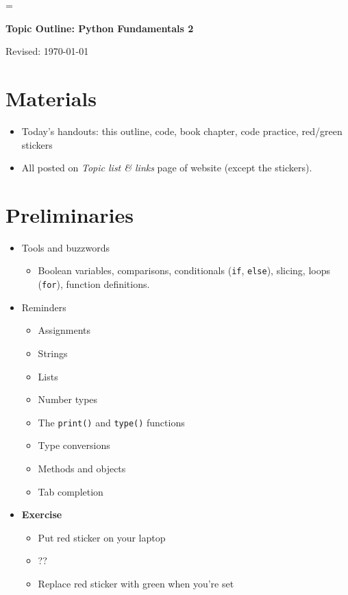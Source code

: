 \documentclass[11pt]{article}
\begin{document}
\parskip=\bigskipamount
\parindent=0.0in
\thispagestyle{empty}


\bigskip\bigskip
\centerline{\Large \bf Topic Outline:  Python Fundamentals 2}
\centerline{Revised: \today}


\section*{Materials}

\begin{itemize}
\item  Today's handouts:  this outline, code, book chapter, code practice, red/green stickers
\item  All posted on {\it Topic list \& links\/} page of website (except the stickers).
\end{itemize}


\section*{Preliminaries}

\begin{itemize}

\item Tools and buzzwords
\begin{itemize}
\item Boolean variables, comparisons, conditionals ({\tt if}, {\tt else}), slicing, 
loops ({\tt for}), function definitions.
\end{itemize}

\item Reminders
\begin{itemize}
\item Assignments
\item Strings
\item Lists 
\item Number types 
\item The {\tt print()} and {\tt type()} functions 
\item Type conversions 
\item Methods and objects 
\item Tab completion 
\end{itemize}

\item {\bf Exercise} 
\begin{itemize}
\item Put red sticker on your laptop
\item ??  
\item Replace red sticker with green when you're set 
\end{itemize}

\end{itemize} 
\end{document}
